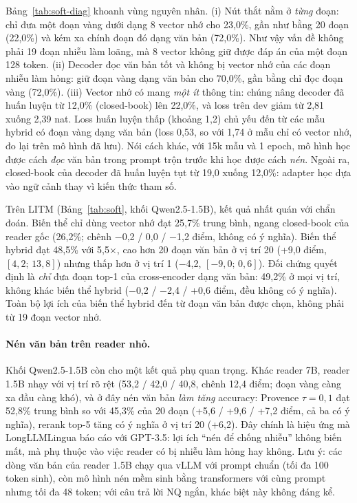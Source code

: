 Bảng~\ref{tab:soft-diag} khoanh vùng nguyên nhân. (i) Nút thắt nằm ở \emph{từng} đoạn: chỉ đưa một
đoạn vàng dưới dạng 8 vector nhớ cho 23,0\%, gần như bằng 20 đoạn (22,0\%) và kém xa chính đoạn đó
dạng văn bản (72,0\%). Như vậy vấn đề không phải 19 đoạn nhiễu làm loãng, mà 8 vector không giữ được
đáp án của một đoạn 128 token. (ii) Decoder đọc văn bản tốt và không bị vector nhớ của các đoạn nhiễu
làm hỏng: giữ đoạn vàng dạng văn bản cho 70,0\%, gần bằng chỉ đọc đoạn vàng (72,0\%). (iii) Vector
nhớ có mang \emph{một ít} thông tin: chúng nâng decoder đã huấn luyện từ 12,0\% (closed-book) lên
22,0\%, và loss trên dev giảm từ 2,81 xuống 2,39 nat. Loss huấn luyện thấp (khoảng 1,2) chủ yếu đến
từ các mẫu hybrid có đoạn vàng dạng văn bản (loss 0,53, so với 1,74 ở mẫu chỉ có vector nhớ, đo lại trên mô hình
đã lưu). Nói cách khác, với 15k mẫu và 1 epoch, mô hình học được cách \emph{đọc} văn bản trong prompt
trộn trước khi học được cách \emph{nén}. Ngoài ra, closed-book của decoder đã huấn luyện tụt từ 19,0
xuống 12,0\%: adapter học dựa vào ngữ cảnh thay vì kiến thức tham số.

Trên LITM (Bảng~\ref{tab:soft}, khối Qwen2.5-1.5B), kết quả nhất quán với chẩn đoán. Biến thể chỉ
dùng vector nhớ đạt 25,7\% trung bình, ngang closed-book của reader gốc (26,2\%; chênh $-$0,2 / 0,0 /
$-$1,2 điểm, không có ý nghĩa). Biến thể hybrid đạt 48,5\% với 5,5$\times$, cao hơn 20 đoạn văn bản ở
vị trí 20 (+9,0 điểm, $[4,2;\,13,8]$) nhưng thấp hơn ở vị trí 1 ($-$4,2, $[-9,0;\,0,6]$). Đối chứng
quyết định là \emph{chỉ} đưa đoạn top-1 của cross-encoder dạng văn bản: 49,2\% ở mọi vị trí, không
khác biến thể hybrid ($-$0,2 / $-$2,4 / +0,6 điểm, đều không có ý nghĩa). Toàn bộ lợi ích của biến thể hybrid đến từ đoạn văn bản được chọn, không phải từ 19 đoạn vector nhớ.

\paragraph{Nén văn bản trên reader nhỏ.} Khối Qwen2.5-1.5B còn cho một kết quả phụ quan trọng. Khác
reader 7B, reader 1.5B nhạy với vị trí rõ rệt (53,2 / 42,0 / 40,8, chênh 12,4 điểm; đoạn vàng càng xa đầu càng khó), và
ở đây nén văn bản \emph{làm tăng} accuracy: Provence $\tau=0{,}1$ đạt 52,8\% trung bình so với 45,3\%
của 20 đoạn (+5,6 / +9,6 / +7,2 điểm, cả ba có ý nghĩa), rerank top-5 tăng có ý nghĩa ở vị trí 20
(+6,2). Đây chính là hiệu ứng mà LongLLMLingua báo cáo với GPT-3.5: lợi ích ``nén để chống nhiễu''
không biến mất, mà phụ thuộc vào việc reader có bị nhiễu làm hỏng hay không. Lưu ý: các dòng văn bản
của reader 1.5B chạy qua vLLM với prompt chuẩn (tối đa 100 token sinh), còn mô hình nén mềm sinh bằng
transformers với cùng prompt nhưng tối đa 48 token; với câu trả lời NQ ngắn, khác biệt này không đáng
kể.


